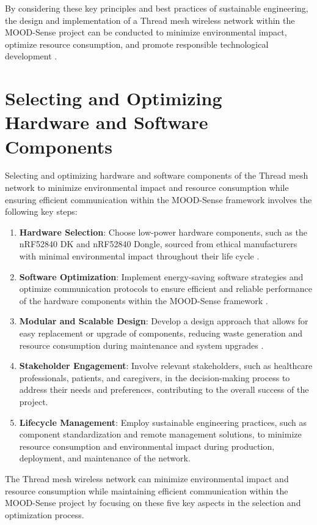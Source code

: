 By considering these key principles and best practices of sustainable engineering, the design and implementation of a Thread mesh wireless network within the MOOD-Sense project can be conducted to minimize environmental impact, optimize resource consumption, and promote responsible technological development \cite{tan2010sustainable}.


\section{Selecting and Optimizing Hardware and Software Components}
Selecting and optimizing hardware and software components of the Thread mesh network to minimize environmental impact and resource consumption while ensuring efficient communication within the MOOD-Sense framework involves the following key steps:

\begin{enumerate}
    \item \textbf{Hardware Selection}: Choose low-power hardware components, such as the nRF52840 DK and nRF52840 Dongle, sourced from ethical manufacturers with minimal environmental impact throughout their life cycle \cite{sabovic2021demonstration}.
    \item \textbf{Software Optimization}: Implement energy-saving software strategies and optimize communication protocols to ensure efficient and reliable performance of the hardware components within the MOOD-Sense framework \cite{s20174779}.
    \item \textbf{Modular and Scalable Design}: Develop a design approach that allows for easy replacement or upgrade of components, reducing waste generation and resource consumption during maintenance and system upgrades \cite{s20072028}.
    \item \textbf{Stakeholder Engagement}: Involve relevant stakeholders, such as healthcare professionals, patients, and caregivers, in the decision-making process to address their needs and preferences, contributing to the overall success of the project.
    \item \textbf{Lifecycle Management}: Employ sustainable engineering practices, such as component standardization and remote management solutions, to minimize resource consumption and environmental impact during production, deployment, and maintenance of the network.
\end{enumerate}

The Thread mesh wireless network can minimize environmental impact and resource consumption while maintaining efficient communication within the MOOD-Sense project by focusing on these five key aspects in the selection and optimization process.


